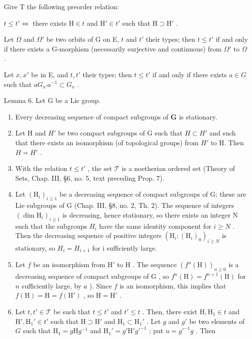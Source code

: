 Give T the following preorder relation:

\(t \leq t'\Longleftrightarrow\) there exists \(\mathrm{H} \in t\) and \(\mathrm{H}' \in t'\) such that \(\mathrm{H} \supset \mathrm{H}'\) .

Let \(\Omega\) and \(\Omega'\) be two orbits of G on E, \(t\) and \(t'\) their types; then \(t \leq t'\) if and only if there exists a G-morphism (necessarily surjective and continuous) from \(\Omega'\) to \(\Omega\) .

Let \(x, x'\) be in E, and \(t, t'\) their types; then \(t \leq t'\) if and only if there exists \(a \in G\) such that \(aG_{x'}a^{-1} \subset G_x\) .

Lemma 6. Let G be a Lie group.

\begin{enumerate}
\def\labelenumi{\alph{enumi})}
\item
  Every decreasing sequence of compact subgroups of \(\mathbf{G}\) is stationary.
\item
  Let H and \(H'\) be two compact subgroups of G such that \(H \subset H'\) and such that there exists an isomorphism (of topological groups) from \(H'\) to H. Then \(H = H'\) .
\item
  With the relation \(t \leq t'\) , the set \(\mathcal{T}\) is a noetherian ordered set (Theory of Sets, Chap. III, §6, no. 5, text preceding Prop. 7).
\item
  Let \((\mathrm{H}_{i})_{i\geq1}\) be a decreasing sequence of compact subgroups of G; these are Lie subgroups of G (Chap. III, §8, no. 2, Th. 2). The sequence of integers \((\dim\mathrm{H}_{i})_{i\geq1}\) is decreasing, hence stationary, so there exists an integer N such that the subgroups \(H_{i}\) have the same identity component for \(i\geq N\) . Then the decreasing sequence of positive integers \((\mathrm{H}_{i}:(\mathrm{H}_{i})_{0})_{i\geq N}\) is stationary, so \(H_{i}=H_{i+1}\) for i sufficiently large.
\item
  Let \(f\) be an isomorphism from \(\mathrm{H}'\) to \(\mathrm{H}\) . The sequence \((f^n(\mathrm{H}))_{n\geq 0}\) is a decreasing sequence of compact subgroups of \(\mathrm{G}\) , so \(f^n(\mathrm{H}) = f^{n + 1}(\mathrm{H})\) for \(n\) sufficiently large, by \(a\) ). Since \(f\) is an isomorphism, this implies that \(f(\mathrm{H}) = \mathrm{H} = f(\mathrm{H}')\) , so \(\mathrm{H} = \mathrm{H}'\) .
\item
  Let \(t, t' \in \mathcal{T}\) be such that \(t \leq t'\) and \(t' \leq t\) . Then, there exist \(\mathrm{H}, \mathrm{H}_1 \in t\) and \(\mathrm{H}', \mathrm{H}_1' \in t'\) such that \(\mathrm{H} \supset \mathrm{H}'\) and \(\mathrm{H}_1 \subset \mathrm{H}_1'\) . Let \(g\) and \(g'\) be two elements of \(G\) such that \(\mathrm{H}_1 = g\mathrm{H}g^{-1}\) and \(\mathrm{H}_1' = g'\mathrm{H}'g'^{-1}\) ; put \(u = g'^{-1}g\) . Then
\end{enumerate}

